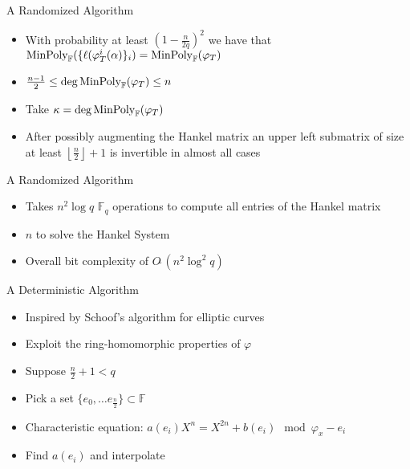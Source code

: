 \documentclass{beamer}
\newcommand{\minpol}{\textnormal{MinPoly}_{\mathbb{F}}}
\newcommand{\f}{\mathbb{F}}
\begin{document}




\begin{frame}{A Randomized Algorithm}

\begin{itemize}
    \item  With probability at least $(1 - \frac{n}{2q})^2$ we have that $\minpol(\{\ell(\varphi_T^i(\alpha)\}_i) = \minpol(\varphi_T)$
    \item $\frac{n-1}{2} \leq \deg \minpol(\varphi_T) \leq n$
    \item Take $\kappa = \deg \minpol(\varphi_T)$
    \item After possibly augmenting the Hankel matrix an upper left submatrix of size at least $\left\lfloor \frac{n}{2} \right\rfloor + 1$ is invertible in almost all cases
\end{itemize}
    
\end{frame}



\begin{frame}{A Randomized Algorithm}
    \begin{itemize}
        \item Takes $n^2 \log q$ $\f_q$ operations to compute all entries of the Hankel matrix
    \item $n$ to solve the Hankel System
    \item Overall bit complexity of $O\tilde{~}(n^2 \log^2 q)$
    \end{itemize}
\end{frame}


\begin{frame}{A Deterministic Algorithm}

\begin{itemize}
    \item Inspired by Schoof's algorithm for elliptic curves
    \item Exploit the ring-homomorphic properties of $\varphi$
    \item Suppose $ \frac{n}{2} + 1 < q$
    \item Pick a set $\{e_0, \ldots e_{\frac{n}{2}}\} \subset \mathbb{F}$
    \item Characteristic equation: $a(e_i) X^n  = X^{2n} + b(e_i) \mod \varphi_{x} - e_i $
    \item Find $a(e_i)$ and interpolate
\end{itemize}
    
\end{frame}
\end{document}
